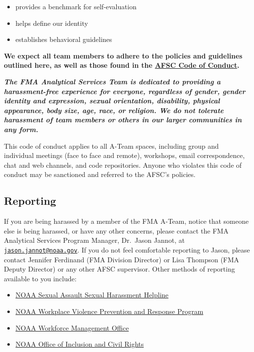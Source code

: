\documentclass[
  letterpaper,
  DIV=11,
  numbers=noendperiod]{scrreprt}
\providecommand{\tightlist}{%
  \setlength{\itemsep}{0pt}\setlength{\parskip}{0pt}}\usepackage{longtable,booktabs,array}
\begin{document}
\begin{itemize}
\tightlist
\item
  provides a benchmark for self-evaluation\\
\item
  helps define our identity\\
\item
  establishes behavioral guidelines
\end{itemize}

\textbf{We expect all team members to adhere to the policies and
guidelines outlined here, as well as those found in the
\href{https://drive.google.com/file/d/1wV0g2Tea0jdPjsTeNNST7I871j70qLAw/view}{AFSC
Code of Conduct}.}

\textbf{\emph{The FMA Analytical Services Team is dedicated to providing
a harassment-free experience for everyone, regardless of gender, gender
identity and expression, sexual orientation, disability, physical
appearance, body size, age, race, or religion. We do not tolerate
harassment of team members or others in our larger communities in any
form.}}

This code of conduct applies to all A-Team spaces, including group and
individual meetings (face to face and remote), workshops, email
correspondence, chat and web channels, and code repositories. Anyone who
violates this code of conduct may be sanctioned and referred to the
AFSC's policies.

\hypertarget{reporting}{%
\subsection{Reporting}\label{reporting}}

If you are being harassed by a member of the FMA A-Team, notice that
someone else is being harassed, or have any other concerns, please
contact the FMA Analytical Services Program Manager, Dr.~Jason Jannot,
at
\href{mailto:jason.jannot@noaa.gov}{\nolinkurl{jason.jannot@noaa.gov}}.
If you do not feel comfortable reporting to Jason, please contact
Jennifer Ferdinand (FMA Division Director) or Lisa Thompson (FMA Deputy
Director) or any other AFSC supervisor. Other methods of reporting
available to you include:

\begin{itemize}
\tightlist
\item
  \href{https://noaasashhelpline.org/}{NOAA Sexual Assault Sexual
  Harassment Helpline}
\item
  \href{https://www.noaa.gov/workplace-violence-prevention-response-program}{NOAA
  Workplace Violence Prevention and Response Program}
\item
  \href{mailto:DAO-955.OHCS@noaa.gov}{NOAA Workforce Management Office}
\item
  \href{mailto:noaa.oicr@noaa.gov}{NOAA Office of Inclusion and Civil
  Rights}
\end{itemize}
\end{document}

